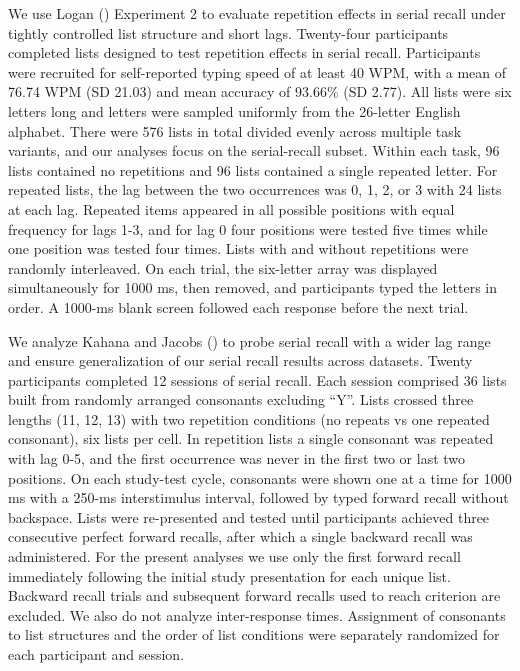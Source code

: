 \documentclass[
  man,
  floatsintext,
  longtable,
  nolmodern,
  notxfonts,
  notimes,
  draftfirst,
  colorlinks=true,linkcolor=blue,citecolor=blue,urlcolor=blue]{apa7}
\begin{document}
We use Logan () Experiment 2 to
evaluate repetition effects in serial recall under tightly controlled
list structure and short lags. Twenty-four participants completed lists
designed to test repetition effects in serial recall. Participants were
recruited for self-reported typing speed of at least 40 WPM, with a mean
of 76.74 WPM (SD 21.03) and mean accuracy of 93.66\% (SD 2.77). All
lists were six letters long and letters were sampled uniformly from the
26-letter English alphabet. There were 576 lists in total divided evenly
across multiple task variants, and our analyses focus on the
serial-recall subset. Within each task, 96 lists contained no
repetitions and 96 lists contained a single repeated letter. For
repeated lists, the lag between the two occurrences was 0, 1, 2, or 3
with 24 lists at each lag. Repeated items appeared in all possible
positions with equal frequency for lags 1-3, and for lag 0 four
positions were tested five times while one position was tested four
times. Lists with and without repetitions were randomly interleaved. On
each trial, the six-letter array was displayed simultaneously for 1000
ms, then removed, and participants typed the letters in order. A 1000-ms
blank screen followed each response before the next trial.

We analyze Kahana and Jacobs
() to probe serial recall
with a wider lag range and ensure generalization of our serial recall
results across datasets. Twenty participants completed 12 sessions of
serial recall. Each session comprised 36 lists built from randomly
arranged consonants excluding ``Y''. Lists crossed three lengths (11,
12, 13) with two repetition conditions (no repeats vs one repeated
consonant), six lists per cell. In repetition lists a single consonant
was repeated with lag 0-5, and the first occurrence was never in the
first two or last two positions. On each study-test cycle, consonants
were shown one at a time for 1000 ms with a 250-ms interstimulus
interval, followed by typed forward recall without backspace. Lists were
re-presented and tested until participants achieved three consecutive
perfect forward recalls, after which a single backward recall was
administered. For the present analyses we use only the first forward
recall immediately following the initial study presentation for each
unique list. Backward recall trials and subsequent forward recalls used
to reach criterion are excluded. We also do not analyze inter-response
times. Assignment of consonants to list structures and the order of list
conditions were separately randomized for each participant and session.
\end{document}

